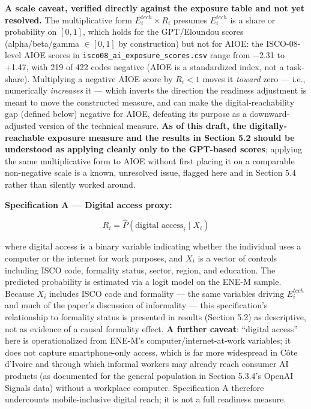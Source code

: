 \documentclass[
  11pt,
]{article}
\begin{document}
\textbf{A scale caveat, verified directly against the exposure table and
not yet resolved.} The multiplicative form \(E_i^{tech} \times R_i\)
presumes \(E_i^{tech}\) is a share or probability on \([0, 1]\), which
holds for the GPT/Eloundou scores (alpha/beta/gamma \(\in [0, 1]\) by
construction) but not for AIOE: the ISCO-08-level AIOE scores in
\texttt{isco08\_ai\_exposure\_scores.csv} range from −2.31 to +1.47,
with 219 of 422 codes negative (AIOE is a standardized index, not a
task-share). Multiplying a negative AIOE score by \(R_i < 1\) moves it
\emph{toward} zero --- i.e., numerically \emph{increases} it --- which
inverts the direction the readiness adjustment is meant to move the
constructed measure, and can make the digital-reachability gap (defined
below) negative for AIOE, defeating its purpose as a downward-adjusted
version of the technical measure. \textbf{As of this draft, the
digitally-reachable exposure measure and the results in Section 5.2
should be understood as applying cleanly only to the GPT-based scores};
applying the same multiplicative form to AIOE without first placing it
on a comparable non-negative scale is a known, unresolved issue, flagged
here and in Section 5.4 rather than silently worked around.

\textbf{Specification A --- Digital access proxy:}

\[R_i = \hat{P}(\text{digital access}_i \mid X_i)\]

where digital access is a binary variable indicating whether the
individual uses a computer or the internet for work purposes, and
\(X_i\) is a vector of controls including ISCO code, formality status,
sector, region, and education. The predicted probability is estimated
via a logit model on the ENE-M sample. Because \(X_i\) includes ISCO
code and formality --- the same variables driving \(E_i^{tech}\) and
much of the paper's discussion of informality --- this specification's
relationship to formality status is presented in results (Section 5.2)
as descriptive, not as evidence of a causal formality effect. \textbf{A
further caveat}: ``digital access'' here is operationalized from ENE-M's
computer/internet-at-work variables; it does not capture smartphone-only
access, which is far more widespread in Côte d'Ivoire and through which
informal workers may already reach consumer AI products (as documented
for the general population in Section 5.3.4's OpenAI Signals data)
without a workplace computer. Specification A therefore undercounts
mobile-inclusive digital reach; it is not a full readiness measure.
\end{document}
